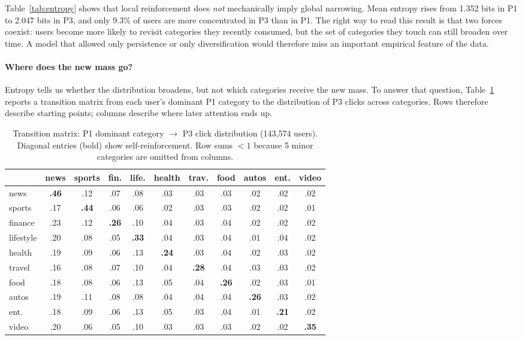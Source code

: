 \documentclass[11pt]{article}
\begin{document}
Table~\ref{tab:entropy} shows that local reinforcement does \emph{not} mechanically imply global narrowing. Mean entropy rises from 1.352 bits in P1 to 2.047 bits in P3, and only 9.3\% of users are more concentrated in P3 than in P1. The right way to read this result is that two forces coexist: users become more likely to revisit categories they recently consumed, but the set of categories they touch can still broaden over time. A model that allowed only persistence or only diversification would therefore miss an important empirical feature of the data.

\paragraph{Where does the new mass go?}
Entropy tells us whether the distribution broadens, but not which categories receive the new mass. To answer that question, Table~\ref{tab:transition} reports a transition matrix from each user's dominant P1 category to the distribution of P3 clicks across categories. Rows therefore describe starting points; columns describe where later attention ends up.

\begin{table}[ht]
\centering
\caption{Transition matrix: P1 dominant category $\to$ P3 click distribution (143,574 users). Diagonal entries (bold) show self-reinforcement. Row sums $< 1$ because 5 minor categories are omitted from columns.}
\label{tab:transition}
\small
\setlength{\tabcolsep}{3.5pt}
\begin{tabular}{l|cccccccccc}
\toprule
& news & sports & fin. & life. & health & trav. & food & autos & ent. & video \\
\midrule
news & \textbf{.46} & .12 & .07 & .08 & .03 & .03 & .03 & .02 & .02 & .02 \\
sports & .17 & \textbf{.44} & .06 & .06 & .02 & .03 & .03 & .02 & .02 & .01 \\
finance & .23 & .12 & \textbf{.26} & .10 & .04 & .03 & .04 & .02 & .02 & .02 \\
lifestyle & .20 & .08 & .05 & \textbf{.33} & .04 & .03 & .04 & .01 & .04 & .02 \\
health & .19 & .09 & .06 & .13 & \textbf{.24} & .03 & .04 & .02 & .03 & .02 \\
travel & .16 & .08 & .07 & .10 & .04 & \textbf{.28} & .04 & .03 & .03 & .02 \\
food & .18 & .08 & .06 & .13 & .05 & .04 & \textbf{.26} & .02 & .03 & .01 \\
autos & .19 & .11 & .08 & .08 & .04 & .04 & .04 & \textbf{.26} & .03 & .02 \\
ent. & .18 & .09 & .06 & .13 & .05 & .03 & .04 & .01 & \textbf{.21} & .02 \\
video & .20 & .06 & .05 & .10 & .03 & .03 & .03 & .02 & .02 & \textbf{.35} \\
\bottomrule
\end{tabular}
\end{table}
\FloatBarrier
\end{document}
